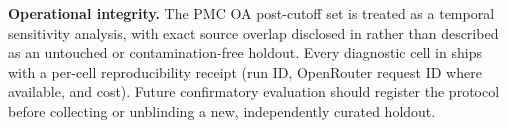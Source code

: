 \textbf{Operational integrity.} The PMC OA post-cutoff set is treated as a
temporal sensitivity analysis, with exact source overlap disclosed in 
rather than described as an untouched or contamination-free holdout. Every
diagnostic cell in  ships with a per-cell reproducibility receipt
(run ID, OpenRouter request ID where available, and cost). Future
confirmatory evaluation should register the protocol before collecting or
unblinding a new, independently curated holdout.

